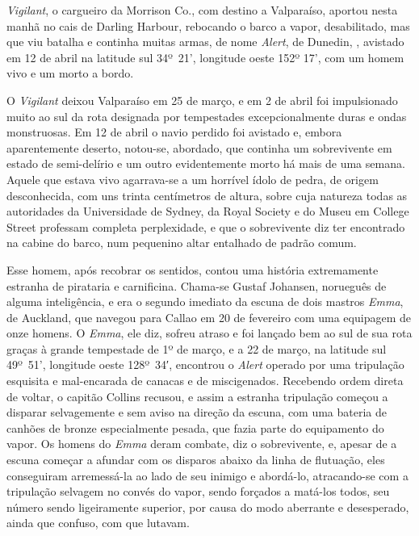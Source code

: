 \emph{Vigilant}, o cargueiro da Morrison Co., com destino a Valparaíso,
aportou nesta manhã no cais de Darling Harbour, rebocando o barco a
vapor, desabilitado, mas que viu batalha e continha muitas armas, de
nome \emph{Alert}, de Dunedin, , avistado em 12 de abril na latitude
sul 34º~21', longitude oeste 152º 17', com um homem vivo e um morto a bordo.

O \emph{Vigilant} deixou Valparaíso em 25 de março, e em 2 de abril foi
impulsionado muito ao sul da rota designada por tempestades
excepcionalmente duras e ondas monstruosas. Em 12 de abril o navio
perdido foi avistado e, embora aparentemente deserto, notou-se,
abordado, que continha um sobrevivente em estado de semi-delírio e um
outro evidentemente morto há mais de uma semana. Aquele que estava vivo
agarrava-se a um horrível ídolo de pedra, de origem desconhecida, com
uns trinta centímetros de altura, sobre cuja natureza todas as
autoridades da Universidade de Sydney, da Royal Society e do Museu em
College Street professam completa perplexidade, e que o sobrevivente diz
ter encontrado na cabine do barco, num pequenino altar entalhado de
padrão comum.

Esse homem, após recobrar os sentidos, contou uma história extremamente
estranha de pirataria e carnificina. Chama-se Gustaf Johansen, norueguês
de alguma inteligência, e era o segundo imediato da escuna de dois
mastros \emph{Emma}, de Auckland, que navegou para Callao em 20 de
fevereiro com uma equipagem de onze homens. O \emph{Emma}, ele diz,
sofreu atraso e foi lançado bem ao sul de sua rota graças à grande
tempestade de 1º de março, e a 22 de março, na
latitude sul 49º~51', longitude
oeste 128º~34′, encontrou o \emph{Alert} operado por uma tripulação
esquisita e mal-encarada de canacas e de miscigenados. Recebendo ordem
direta de voltar, o capitão Collins recusou, e assim a estranha
tripulação começou a disparar selvagemente e sem aviso na direção da
escuna, com uma bateria de canhões de bronze especialmente pesada, que
fazia parte do equipamento do vapor. Os homens do \emph{Emma} deram
combate, diz o sobrevivente, e, apesar de a escuna começar a afundar com
os disparos abaixo da linha de flutuação, eles conseguiram arremessá-la
ao lado de seu inimigo e abordá-lo, atracando-se com a tripulação
selvagem no convés do vapor, sendo forçados a matá-los todos, seu número
sendo ligeiramente superior, por causa do modo aberrante e desesperado,
ainda que confuso, com que lutavam.

